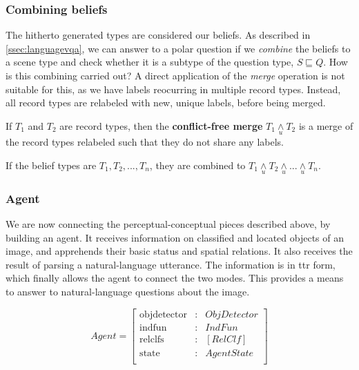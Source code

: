 \subsubsection{Combining beliefs}

The hitherto generated types are considered our beliefs.
As described in \autoref{ssec:languagevqa}, we can answer to a polar question if we \textit{combine} the beliefs to a scene type and check whether it is a subtype of the question type, $S \sqsubseteq Q$.
How is this combining carried out?
A direct application of the \textit{merge} operation is not suitable for this, as we have labels reocurring in multiple record types.
Instead, all record types are relabeled with new, unique labels, before being merged.

\label{def:cfmerge}
If $T_1$ and $T_2$ are record types, then the \textbf{conflict-free merge} $T_1 \underset{u}{\wedge} T_2$ is a merge of the record types relabeled such that they do not share any labels.

If the belief types are $T_1, T_2, ..., T_n$, they are combined to $T_1 \underset{u}{\wedge} T_2 \underset{u}{\wedge} ... \underset{u}{\wedge} T_n$.



\subsubsection{Agent}
\label{sec:agent}

We are now connecting the perceptual-conceptual pieces described above, by building an agent.
It receives information on classified and located objects of an image, and apprehends their basic status and spatial relations.
It also receives the result of parsing a natural-language utterance.
The information is in \gls{ttr} form, which finally allows the agent to connect the two modes.
This provides a means to answer to natural-language questions about the image.

\begin{equation}\label{eq:agent}
Agent = \left[\begin{array}{rcl}
    \text{objdetector} &:& ObjDetector \\
    \text{indfun} &:& IndFun \\
    \text{relclfs} &:& [RelClf] \\
    \text{state} &:& AgentState \\
    \end{array}\right]
\end{equation}

